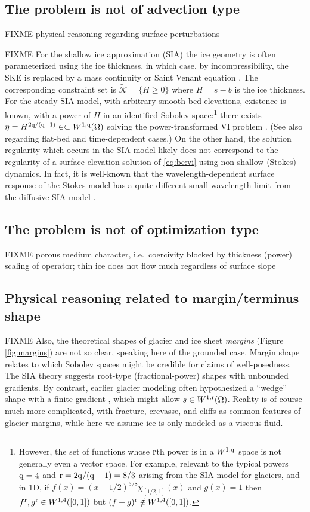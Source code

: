 \documentclass[hidelinks,onefignum,onetabnum,final]{siamart220329}  %
\newcommand{\cK}{\mathcal{K}}
\newcommand{\qq}{{\text{\textnormal{q}}}}
\newcommand{\rr}{{\text{\textnormal{r}}}}
\begin{document}
\subsection{The problem is not of advection type} \label{subsec:notadv}    FIXME physical reasoning regarding surface perturbations

FIXME For the shallow ice approximation (SIA) the ice geometry is often parameterized using the ice thickness, in which case, by incompressibility, the SKE is replaced by a mass continuity or Saint Venant equation \cite{JouvetBueler2012}.  The corresponding constraint set is $\tilde{\cK} = \{H\ge 0\}$ where $H=s-b$ is the ice thickness.   For the steady SIA model, with arbitrary smooth bed elevations, existence is known, with a power of $H$ in an identified Sobolev space:\footnote{However, the set of functions whose $\rr$th power is in a $W^{1,\qq}$ space is not generally even a vector space.  For example, relevant to the typical powers $\qq=4$ and $\rr=2\qq/(\qq-1)=8/3$ arising from the SIA model for glaciers, and in 1D, if $f(x)=(x-1/2)^{3/8} \chi_{[1/2,1]}(x)$ and $g(x)=1$ then $f^\rr,g^\rr \in W^{1,4}([0,1])$ but $(f+g)^\rr\notin W^{1,4}([0,1])$.} there exists $\eta = H^{2\qq/(\qq-1)} \in \subset W^{1,\qq}(\Omega)$ solving the power-transformed VI problem \cite{JouvetBueler2012}.  (See also \cite{Calvoetal2003,PiersantiTemam2023} regarding flat-bed and time-dependent cases.)  On the other hand, the solution regularity which occurs in the SIA model likely does not correspond to the regularity of a surface elevation solution of \eqref{eq:be:vi} using non-shallow (Stokes) dynamics.  In fact, it is well-known that the wavelength-dependent surface response of the Stokes model has a quite different small wavelength limit from the diffusive SIA model \cite[for example]{Pattynetal2008}.

\subsection{The problem is not of optimization type} \label{subsec:notopt}  FIXME porous medium character, i.e.~coercivity blocked by thickness (power) scaling of operator; thin ice does not flow much regardless of surface slope

\subsection{Physical reasoning related to margin/terminus shape} \label{subsec:margin}  FIXME Also, the theoretical shapes of glacier and ice sheet \emph{margins} (Figure \ref{fig:margins}) are not so clear, speaking here of the grounded case.  Margin shape relates to which Sobolev spaces might be credible for claims of well-posedness.  The SIA theory suggests root-type (fractional-power) shapes \cite{Bueleretal2005} with unbounded gradients.  By contrast, earlier glacier modeling often hypothesized a ``wedge'' shape with a finite gradient \cite[for example]{EchelmeyerKamb1986}, which might allow $s\in W^{1,\rr}(\Omega)$.  Reality is of course much more complicated, with fracture, crevasse, and cliffs as common features of glacier margins, while here we assume ice is only modeled as a viscous fluid.
\end{document}
